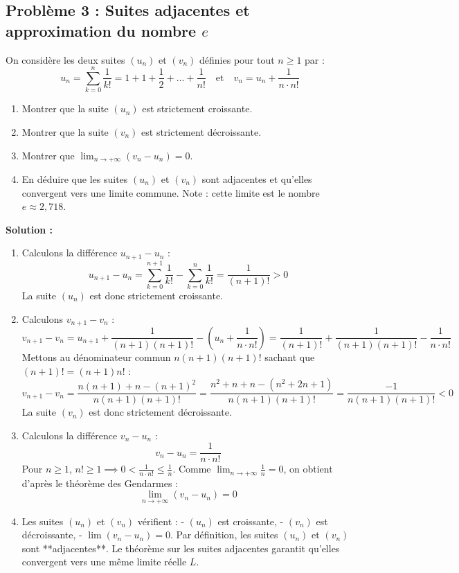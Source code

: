 \subsection*{Problème 3 : Suites adjacentes et approximation du nombre $e$}
On considère les deux suites $(u_n)$ et $(v_n)$ définies pour tout $n \ge 1$ par :
\[
u_n = \sum_{k=0}^n \frac{1}{k!} = 1 + 1 + \frac{1}{2} + \dots + \frac{1}{n!} \quad \text{et} \quad v_n = u_n + \frac{1}{n \cdot n!}
\]
\begin{enumerate}
    \item Montrer que la suite $(u_n)$ est strictement croissante.
    \item Montrer que la suite $(v_n)$ est strictement décroissante.
    \item Montrer que $\lim_{n \to +\infty} (v_n - u_n) = 0$.
    \item En déduire que les suites $(u_n)$ et $(v_n)$ sont adjacentes et qu'elles convergent vers une limite commune. Note : cette limite est le nombre $e \approx 2,718$.
\end{enumerate}

\textbf{Solution :}
\begin{enumerate}
    \item Calculons la différence $u_{n+1} - u_n$ :
    \[
    u_{n+1} - u_n = \sum_{k=0}^{n+1} \frac{1}{k!} - \sum_{k=0}^n \frac{1}{k!} = \frac{1}{(n+1)!} > 0
    \]
    La suite $(u_n)$ est donc strictement croissante.
    
    \item Calculons $v_{n+1} - v_n$ :
    \[
    v_{n+1} - v_n = u_{n+1} + \frac{1}{(n+1)(n+1)!} - \left( u_n + \frac{1}{n \cdot n!} \right) = \frac{1}{(n+1)!} + \frac{1}{(n+1)(n+1)!} - \frac{1}{n \cdot n!}
    \]
    Mettons au dénominateur commun $n(n+1)(n+1)!$ sachant que $(n+1)! = (n+1)n!$ :
    \[
    v_{n+1} - v_n = \frac{n(n+1) + n - (n+1)^2}{n(n+1)(n+1)!} = \frac{n^2 + n + n - (n^2 + 2n + 1)}{n(n+1)(n+1)!} = \frac{-1}{n(n+1)(n+1)!} < 0
    \]
    La suite $(v_n)$ est donc strictement décroissante.
    
    \item Calculons la différence $v_n - u_n$ :
    \[
    v_n - u_n = \frac{1}{n \cdot n!}
    \]
    Pour $n \ge 1$, $n! \ge 1 \implies 0 < \frac{1}{n \cdot n!} \le \frac{1}{n}$.
    Comme $\lim_{n \to +\infty} \frac{1}{n} = 0$, on obtient d'après le théorème des Gendarmes :
    \[
    \lim_{n \to +\infty} (v_n - u_n) = 0
    \]
    
    \item Les suites $(u_n)$ et $(v_n)$ vérifient :
    - $(u_n)$ est croissante,
    - $(v_n)$ est décroissante,
    - $\lim (v_n - u_n) = 0$.
    Par définition, les suites $(u_n)$ et $(v_n)$ sont **adjacentes**.
    Le théorème sur les suites adjacentes garantit qu'elles convergent vers une même limite réelle $L$.
\end{enumerate}

